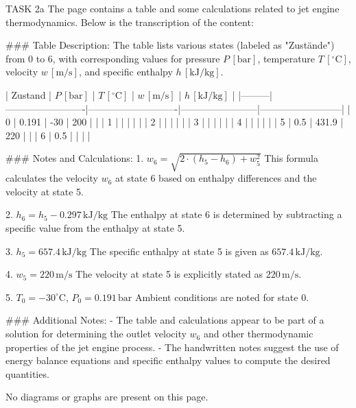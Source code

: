 TASK 2a  
The page contains a table and some calculations related to jet engine thermodynamics. Below is the transcription of the content:

### Table Description:
The table lists various states (labeled as "Zustände") from 0 to 6, with corresponding values for pressure \( P \, [\text{bar}] \), temperature \( T \, [^\circ\text{C}] \), velocity \( w \, [\text{m/s}] \), and specific enthalpy \( h \, [\text{kJ/kg}] \).  

| Zustand | \( P \, [\text{bar}] \) | \( T \, [^\circ\text{C}] \) | \( w \, [\text{m/s}] \) | \( h \, [\text{kJ/kg}] \) |
|---------|-------------------------|----------------------------|------------------------|--------------------------|
| 0       | 0.191                   | -30                        | 200                    |                          |
| 1       |                         |                            |                        |                          |
| 2       |                         |                            |                        |                          |
| 3       |                         |                            |                        |                          |
| 4       |                         |                            |                        |                          |
| 5       | 0.5                     | 431.9                      | 220                    |                          |
| 6       | 0.5                     |                            |                        |                          |

### Notes and Calculations:
1. \( w_6 = \sqrt{2 \cdot \left( h_5 - h_6 \right) + w_5^2} \)  
   This formula calculates the velocity \( w_6 \) at state 6 based on enthalpy differences and the velocity at state 5.  

2. \( h_6 = h_5 - 0.297 \, \text{kJ/kg} \)  
   The enthalpy at state 6 is determined by subtracting a specific value from the enthalpy at state 5.  

3. \( h_5 = 657.4 \, \text{kJ/kg} \)  
   The specific enthalpy at state 5 is given as \( 657.4 \, \text{kJ/kg} \).  

4. \( w_5 = 220 \, \text{m/s} \)  
   The velocity at state 5 is explicitly stated as \( 220 \, \text{m/s} \).  

5. \( T_0 = -30^\circ\text{C} \), \( P_0 = 0.191 \, \text{bar} \)  
   Ambient conditions are noted for state 0.  

### Additional Notes:
- The table and calculations appear to be part of a solution for determining the outlet velocity \( w_6 \) and other thermodynamic properties of the jet engine process.  
- The handwritten notes suggest the use of energy balance equations and specific enthalpy values to compute the desired quantities.  

No diagrams or graphs are present on this page.